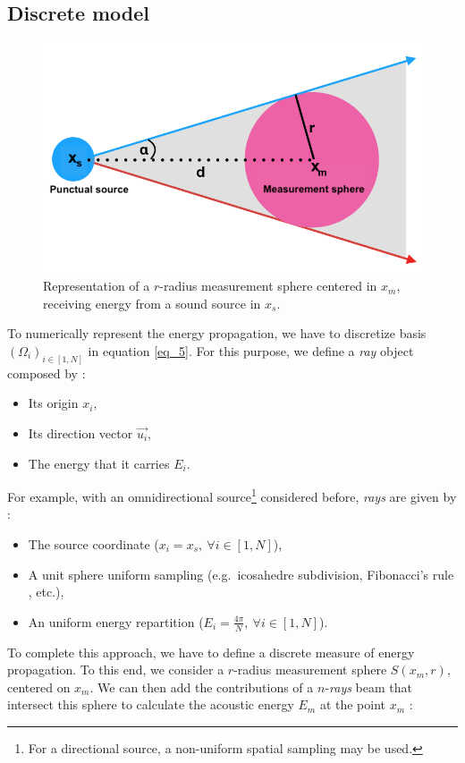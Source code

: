 \documentclass[AMA,STIX1COL]{WileyNJD-v2}
\begin{document}
\subsection{Discrete model}

\begin{figure}[t]
\centering
	\includegraphics[width=0.6\linewidth]{schema_rayon}
	\caption{Representation of a $r$-radius measurement sphere centered in $x_m$, receiving energy from a sound source in $x_s$.}
	\label{schema_rayon}
\end{figure}

To numerically represent the energy propagation, we have to discretize basis $(\Omega_i)_{i\in[1,N] }$ in equation \ref{eq_5}. For this purpose, we define a \textit{ray} object composed by :
\begin{itemize}
\item Its origin $x_i$,
\item Its direction vector $\overrightarrow{u_i}$,
\item The energy that it carries $E_i$.
\end{itemize}

For example, with an omnidirectional source\footnote{For a directional source, a non-uniform spatial sampling may be used.} considered before, \textit{rays} are given by :
\begin{itemize}
\item The source coordinate ($x_i = x_s,~\forall i\in[1,N]$),
\item A unit sphere uniform sampling (e.g.~icosahedre subdivision, Fibonacci's rule \cite{fibonacci}, etc.),
\item An uniform energy repartition ($E_i = \frac{4\pi}{N},~\forall i\in[1,N]$).
\end{itemize}

To complete this approach, we have to define a discrete measure of energy propagation. To this end, we consider a $r$-radius measurement sphere $S(x_m, r)$, centered on $x_m$.  We can then add the contributions of a $n$-\textit{rays}  beam that intersect this sphere to calculate the acoustic energy $E_m$ at the point $x_m$ :
\end{document}
